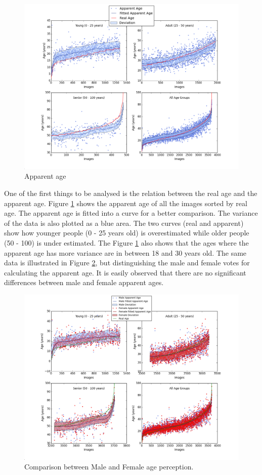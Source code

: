 \begin{figure}[h!]
	\centering
	\includegraphics[width=\textwidth]{figures/Labels_across_img}
	\caption{Apparent age }
	\label{fig:apparent_real}
\end{figure}

One of the first things to be analysed is the relation between the real age and the apparent age. Figure \ref{fig:apparent_real} shows the apparent age of all the images sorted by real age. The apparent age is fitted into a curve for a better comparison. The variance of the data is also plotted as a blue area. The two curves (real and apparent) show how younger people (0 - 25 years old) is overestimated while older people (50 - 100) is under estimated. The Figure \ref{fig:apparent_real} also shows that the ages where the apparent age has more variance are in between 18 and 30 years old. The same data is illustrated in Figure \ref{fig:gender}, but distinguishing the male and female votes for calculating the apparent age. It is easily observed that there are no significant differences between male and female apparent ages.


\begin{figure}[h!]
	\centering
	\includegraphics[width=\textwidth]{figures/Labels_across_img_gender}
	\caption{Comparison between Male and Female age perception.}
	\label{fig:gender}
\end{figure}

